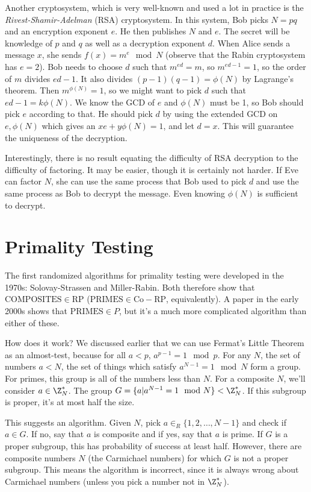 Another cryptosystem, which is very well-known and used a lot in practice is the \textit{Rivest-Shamir-Adelman} (RSA) cryptosystem.  In this system, Bob picks $N=pq$ and an encryption exponent $e$.  He then publishes $N$ and $e$.  The secret will be knowledge of $p$ and $q$ as well as a decryption exponent $d$.  When Alice sends a message $x$, she sends $f(x) = m^e \mod N$ (observe that the Rabin cryptosystem has $e=2$).  Bob needs to choose $d$ such that $m^{ed}=m$, so $m^{ed-1}=1$, so the order of $m$ divides $ed-1$.  It also divides $(p-1)(q-1) = \phi(N)$ by Lagrange's theorem. Then $m^{\phi(N)} = 1$, so we might want to pick $d$ such that $ed-1=k\phi(N)$.  We know the GCD of $e$ and $\phi(N)$ must be 1, so Bob should pick $e$ according to that.  He should pick $d$ by using the extended GCD on $e,\phi(N)$ which gives an $xe+y\phi(N) = 1$, and let $d=x$.  This will guarantee the uniqueness of the decryption.

Interestingly, there is no result equating the difficulty of RSA decryption to the difficulty of factoring.  It may be easier, though it is certainly not harder.  If Eve can factor $N$, she can use the same process that Bob used to pick $d$ and use the same process as Bob to decrypt the message.  Even knowing $\phi(N)$ is sufficient to decrypt.  

\section{Primality Testing}

The first randomized algorithms for primality testing were developed in the 1970s: Solovay-Strassen and Miller-Rabin.  Both therefore show that $\mathrm{COMPOSITES}\in\mathrm{RP}$ ($\mathrm{PRIMES}\in\mathrm{Co-RP}$, equivalently).  A paper in the early 2000s shows that $\mathrm{PRIMES}\in P$, but it's a much more complicated algorithm than either of these.

How does it work?  We discussed earlier that we can use Fermat's Little Theorem as an almost-test, because for all $a<p$, $a^{p-1}=1\mod p$.  For any $N$, the set of numbers $a<N$, the set of things which satisfy $a^{N-1}=1\mod N$ form a group.  For primes, this group is all of the numbers less than $N$.  For a composite $N$, we'll consider $a\in\Z_N^*$.  The group $G=\{  a\vert a^{N-1}=1\mod N   \} < \Z_N^*$.  If this subgroup is proper, it's at most half the size.

This suggests an algorithm.  Given $N$, pick $a\in_R\{1,2,\dots,N-1\}$ and check if $a\in G$.  If no, say that $a$ is composite and if yes, say that $a$ is prime.  If $G$ is a proper subgroup, this has probability of success at least half.  However, there are composite numbers $N$ (the Carmichael numbers) for which $G$ is not a proper subgroup.  This means the algorithm is incorrect, since it is always wrong about Carmichael numbers (unless you pick a number not in $\Z_N^*$).

